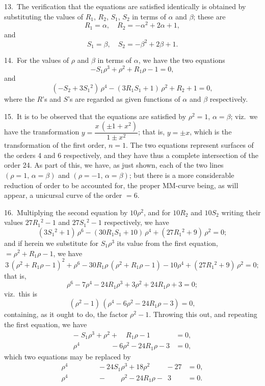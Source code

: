 \documentclass[12pt,a4paper]{article}
\theoremstyle{definition}
\begin{document}
13.\ The verification that the equations are satisfied identically is obtained by
substituting the values of $R_1$, $R_2$, $S_1$, $S_2$ in terms of $\alpha$ and $\beta$; these are
\[
R_1 = \alpha, \quad R_2 = -\alpha^2 + 2\alpha + 1,
\]
and
\[
S_1 = \beta, \quad S_2 = -\beta^2 + 2\beta + 1.
\]

14.\ For the values of $\rho$ and $\beta$ in terms of $\alpha$, we have the two equations
\[
-S_1 \rho^3 + \rho^2 + R_1 \rho - 1 = 0,
\]
and
\[
(-S_2 + 3S_1{}^2)\, \rho^4 - (3R_1 S_1 + 1)\, \rho^2 + R_2 + 1 = 0,
\]
where the $R$'s and $S$'s are regarded as given functions of $\alpha$ and $\beta$ respectively.

15.\ It is to be observed that the equations are satisfied by $\rho^2 = 1$, $\alpha = \beta$; viz.\ we
have the transformation $y = \dfrac{x\, (\pm 1 + x^2)}{1 \pm x^2}$; that is, $y = \pm x$, which is the transformation
of the first order, $n = 1$. The two equations represent surfaces of the orders 4 and 6
respectively, and they have thus a complete intersection of the order 24. As part of
this, we have, as just shown, each of the two lines $(\rho = 1,\, \alpha = \beta)$ and $(\rho = -1,\, \alpha = \beta)$;
but there is a more considerable reduction of order to be accounted for, the proper
MM-curve being, as will appear, a unicursal curve of the order $= 6$.

16.\ Multiplying the second equation by $10\rho^2$, and for $10R_2$ and $10S_2$ writing their
values $27R_1{}^2 - 1$ and $27S_1{}^2 - 1$ respectively, we have
\[
(3S_1{}^2 + 1)\, \rho^6 - (30R_1 S_1 + 10)\, \rho^4 + (27R_1{}^2 + 9)\, \rho^2 = 0;
\]
and if herein we substitute for $S_1 \rho^3$ its value from the first equation, $= \rho^2 + R_1 \rho - 1$,
we have
\[
3\, (\rho^2 + R_1 \rho - 1)^2 + \rho^6 - 30R_1 \rho\, (\rho^2 + R_1 \rho - 1) - 10\rho^4 + (27R_1{}^2 + 9)\, \rho^2 = 0;
\]
that is,
\[
\rho^6 - 7\rho^4 - 24R_1 \rho^3 + 3\rho^2 + 24R_1 \rho + 3 = 0;
\]
viz.\ this is
\[
(\rho^2 - 1)\, (\rho^4 - 6\rho^2 - 24R_1 \rho - 3) = 0,
\]
containing, as it ought to do, the factor $\rho^2 - 1$. Throwing this out, and repeating the
first equation, we have
\[
\begin{aligned}
-\; S_1 \rho^3 + \rho^2 + \phantom{24}R_1 \rho - 1 &= 0,\\
\rho^4 \phantom{{} - 24R_1 \rho^3} - 6\rho^2 - 24R_1 \rho - 3 &= 0,
\end{aligned}
\]
which two equations may be replaced by
\[
\begin{aligned}
\rho^4 \phantom{{} - 24S_1 \rho^3} - 24S_1 \rho^3 + 18\rho^2 \phantom{{} - 27} - 27 &= 0,\\
\rho^4 \phantom{{} - 24S_1 \rho^3} - \phantom{24S_1} \rho^2 - 24R_1 \rho - \phantom{2} 3 &= 0.
\end{aligned}
\]
\end{document}
